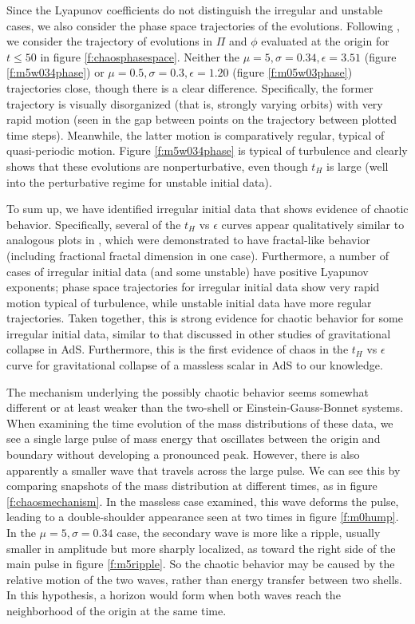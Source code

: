 \documentclass[../PhD.tex]{subfiles}
\begin{document}
Since the Lyapunov coefficients do not distinguish the irregular and unstable
cases, we also consider the phase space trajectories of the evolutions.
Following \cite{deOliveira:2012ac}, we consider the trajectory of evolutions
in $\Pi$ and $\phi$ evaluated at the origin for $t\leq 50$
in figure \ref{f:chaosphasespace}. Neither the 
$\mu=5,\sigma=0.34,\epsilon=3.51$ (figure \ref{f:m5w034phase}) or 
$\mu=0.5,\sigma=0.3,\epsilon=1.20$ (figure \ref{f:m05w03phase}) trajectories
close, though there is a clear difference. Specifically, the former trajectory
is visually disorganized (that is, strongly varying orbits) with very rapid
motion (seen in the gap between points on the trajectory between plotted
time steps). Meanwhile, the latter motion is comparatively regular, typical
of quasi-periodic motion. Figure \ref{f:m5w034phase} is typical of 
turbulence and clearly shows that these evolutions are nonperturbative, 
even though $t_H$ is large (well into the perturbative regime for unstable
initial data).

To sum up, we have identified irregular initial data that shows evidence of
chaotic behavior. Specifically, several of the $t_H$ vs $\epsilon$ curves
appear qualitatively similar to analogous plots in 
\cite{1602.03535,1410.1869,1608.05402}, which were demonstrated to have
fractal-like behavior (including fractional fractal dimension in one case).
Furthermore, a number of cases of irregular initial data (and some unstable)
have positive Lyapunov exponents; phase space trajectories for irregular
initial data show very rapid motion typical of turbulence, while unstable
initial data have more regular trajectories. Taken together, this is strong
evidence for chaotic behavior for some irregular initial data, similar 
to that discussed in other studies of gravitational collapse in AdS. 
Furthermore,
this is the first evidence of chaos in the $t_H$ vs $\epsilon$ curve for
gravitational collapse of a massless scalar in AdS to our knowledge.

The mechanism underlying the possibly chaotic behavior seems somewhat different
or at least weaker than the two-shell or Einstein-Gauss-Bonnet systems.
When examining the time evolution of the mass distributions of
these data, we see a single large pulse of mass energy that oscillates
between the origin and boundary without developing a pronounced peak.
However, there is also apparently a smaller wave that travels across the
large pulse.  We can see this by comparing snapshots of the mass distribution
at different times, as in figure \ref{f:chaosmechanism}.
In the massless case examined, this wave deforms the pulse,
leading to a double-shoulder appearance seen at two times in
figure \ref{f:m0hump}.
In the $\mu=5,\sigma=0.34$ case, the secondary wave is more like a ripple,
usually smaller in amplitude but more sharply localized, as toward the right
side of the main pulse in figure \ref{f:m5ripple}.  So the chaotic behavior
may be caused by the relative motion of the two waves, rather than energy
transfer between two shells.  In this hypothesis, a horizon would form when
both waves reach the neighborhood of the origin at the same time.
\end{document}
